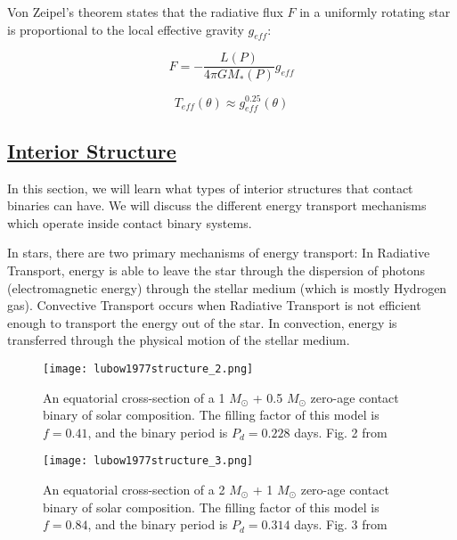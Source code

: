 \documentclass[12pt]{article} %
\numberwithin{equation}{section} %
\begin{document}
Von Zeipel's theorem states that the radiative flux $F$ in a uniformly rotating star is proportional to the local effective gravity $g_{eff}$:

\begin{equation} \label{von_zeipel}
F = - \frac{L(P)}{4\pi G M_{*}(P)}g_{eff}
\end{equation}

\begin{equation} \label{von_zeipel_2}
T_{eff}(\theta) \approx g_{eff}^{0.25}(\theta)
\end{equation}

\citep{von1924radiative.bib}

\citep{gazeas2006masses}

\subsection[Interior Structure]{\hyperlink{toc}{Interior Structure}} \label{sec: Interior Structure}

In this section, we will learn what types of interior structures that contact binaries can have. We will discuss the different energy transport mechanisms which operate inside contact binary systems.

In stars, there are two primary mechanisms of energy transport: In Radiative Transport, energy is able to leave the star through the dispersion of photons (electromagnetic energy) through the stellar medium (which is mostly Hydrogen gas). Convective Transport occurs when Radiative Transport is not efficient enough to transport the energy out of the star. In convection, energy is transferred through the physical motion of the stellar medium. \\

\begin{figure}[H]
\centering
\texttt{[image: lubow1977structure\_2.png]}
\caption{An equatorial cross-section of a 1 $M_{\odot}$ + 0.5 $M_{\odot}$ zero-age contact binary of solar composition. The filling factor of this model is $f = 0.41$, and the binary period is $P_{d} = 0.228$ days. Fig. 2 from \citet{lubow1977structure}}
\label{fig: lubow1977structure_2}
\end{figure}

\begin{figure}[H]
\centering
\texttt{[image: lubow1977structure\_3.png]}
\caption{An equatorial cross-section of a 2 $M_{\odot}$ + 1 $M_{\odot}$ zero-age contact binary of solar composition. The filling factor of this model is $f = 0.84$, and the binary period is $P_{d} = 0.314$ days. Fig. 3 from \citet{lubow1977structure}}
\label{fig: lubow1977structure_3}
\end{figure}
\end{document}

